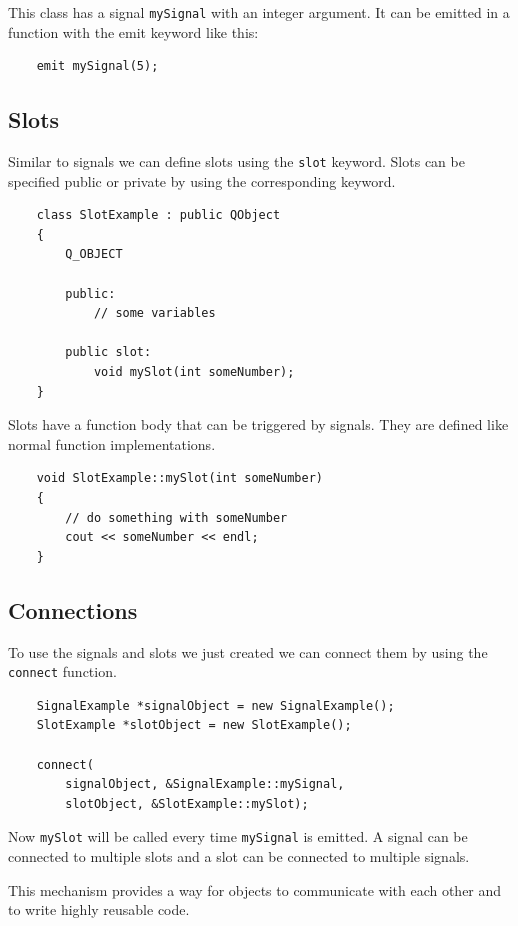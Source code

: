 This class has a signal {\tt mySignal} with an integer argument. It can be emitted in a function with the emit keyword like this:

\begin{lstlisting}
	emit mySignal(5);
\end{lstlisting}

\subsection{Slots}

Similar to signals we can define slots using the {\tt slot} keyword. Slots can be specified public or private by using the corresponding keyword.

\begin{lstlisting}
	class SlotExample : public QObject
	{
		Q_OBJECT
		
		public:
			// some variables
			
		public slot:
			void mySlot(int someNumber);
	}
\end{lstlisting}

Slots have a function body that can be triggered by signals. They are defined like normal function implementations.

\begin{lstlisting}
	void SlotExample::mySlot(int someNumber) 
	{
		// do something with someNumber
		cout << someNumber << endl;
	}
\end{lstlisting}

\subsection{Connections}

To use the signals and slots we just created we can connect them by using the {\tt connect} function. 

\begin{lstlisting}
	SignalExample *signalObject = new SignalExample();
	SlotExample *slotObject = new SlotExample();

	connect(
		signalObject, &SignalExample::mySignal, 
		slotObject, &SlotExample::mySlot);
\end{lstlisting}

Now {\tt mySlot} will be called every time {\tt mySignal} is emitted. A signal can be connected to multiple slots and a slot can be connected to multiple signals. 

This mechanism provides a way for objects to communicate with each other and to write highly reusable code. 

